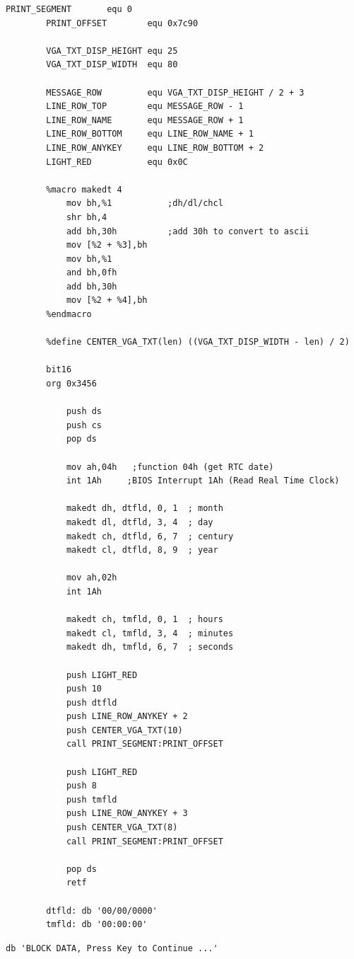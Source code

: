 \documentclass{article}
\begin{document}
    \begin{lstlisting}[caption={datetimeV04.asm listing}, captionpos=t]
        PRINT_SEGMENT       equ 0
        PRINT_OFFSET        equ 0x7c90

        VGA_TXT_DISP_HEIGHT equ 25
        VGA_TXT_DISP_WIDTH  equ 80

        MESSAGE_ROW         equ VGA_TXT_DISP_HEIGHT / 2 + 3
        LINE_ROW_TOP        equ MESSAGE_ROW - 1
        LINE_ROW_NAME       equ MESSAGE_ROW + 1
        LINE_ROW_BOTTOM     equ LINE_ROW_NAME + 1
        LINE_ROW_ANYKEY     equ LINE_ROW_BOTTOM + 2
        LIGHT_RED           equ 0x0C

        %macro makedt 4
            mov bh,%1 			;dh/dl/chcl
            shr bh,4
            add bh,30h 			;add 30h to convert to ascii
            mov [%2 + %3],bh
            mov bh,%1
            and bh,0fh
            add bh,30h
            mov [%2 + %4],bh
        %endmacro

        %define CENTER_VGA_TXT(len) ((VGA_TXT_DISP_WIDTH - len) / 2)

        bit16
        org 0x3456

            push ds
            push cs
            pop ds

            mov ah,04h	 ;function 04h (get RTC date)
            int 1Ah		;BIOS Interrupt 1Ah (Read Real Time Clock)

            makedt dh, dtfld, 0, 1  ; month
            makedt dl, dtfld, 3, 4  ; day
            makedt ch, dtfld, 6, 7  ; century
            makedt cl, dtfld, 8, 9  ; year

            mov ah,02h
            int 1Ah

            makedt ch, tmfld, 0, 1  ; hours
            makedt cl, tmfld, 3, 4  ; minutes
            makedt dh, tmfld, 6, 7  ; seconds

            push LIGHT_RED
            push 10
            push dtfld
            push LINE_ROW_ANYKEY + 2
            push CENTER_VGA_TXT(10)
            call PRINT_SEGMENT:PRINT_OFFSET

            push LIGHT_RED
            push 8
            push tmfld
            push LINE_ROW_ANYKEY + 3
            push CENTER_VGA_TXT(8)
            call PRINT_SEGMENT:PRINT_OFFSET

            pop ds
            retf

        dtfld: db '00/00/0000'
        tmfld: db '00:00:00'
    \end{lstlisting}

    \begin{lstlisting}[caption={stringV04.asm listing}, captionpos=t]
        db 'BLOCK DATA, Press Key to Continue ...'
    \end{lstlisting}
    
\end{document}
